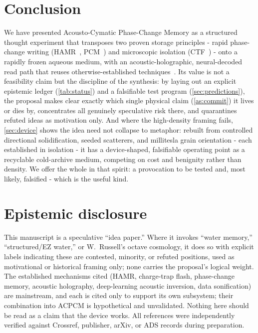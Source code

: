 \documentclass[11pt]{article}
\theoremstyle{definition}
\begin{document}
\FloatBarrier %

\section{Conclusion}
\label{sec:conclusion}

We have presented Acousto-Cymatic Phase-Change Memory as a structured thought experiment that
transposes two proven storage principles - rapid phase-change writing
(HAMR~\cite{kryder2008hamr}, PCM~\cite{wuttig2007pcm}) and microscopic isolation
(CTF~\cite{white2000sonos}) - onto a rapidly frozen aqueous medium, with an
acoustic-holographic, neural-decoded read path that reuses otherwise-established
techniques~\cite{melde2016holograms,lin2021dlholograms}. Its value is not a feasibility
claim but the discipline of the synthesis: by laying out an explicit epistemic ledger
(\cref{tab:status}) and a falsifiable test program (\cref{sec:predictions}), the proposal
makes clear exactly which single physical claim (\cref{as:commit}) it lives or dies by,
concentrates all genuinely speculative risk there, and quarantines refuted ideas as
motivation only. And where the high-density framing fails, \cref{sec:device} shows the idea
need not collapse to metaphor: rebuilt from controlled directional solidification, seeded
scatterers, and millitesla grain orientation - each established in isolation - it has a
device-shaped, falsifiable operating point as a recyclable cold-archive medium, competing on
cost and benignity rather than density. We offer the whole in that spirit: a provocation to be
tested and, most likely, falsified - which is the useful kind.

\section*{Epistemic disclosure}
\small
This manuscript is a speculative ``idea paper.'' Where it invokes ``water memory,''
``structured/EZ water,'' or W.~Russell's octave cosmology, it does so with explicit labels
indicating these are contested, minority, or refuted positions, used as motivational or
historical framing only; none carries the proposal's logical weight. The established
mechanisms cited (HAMR, charge-trap flash, phase-change memory, acoustic holography,
deep-learning acoustic inversion, data sonification) are mainstream, and each is cited only
to support its own subsystem; their combination into ACPCM is hypothetical and unvalidated.
Nothing here should be read as a claim that the device works. All references were
independently verified against Crossref, publisher, arXiv, or ADS records during
preparation.
\end{document}
